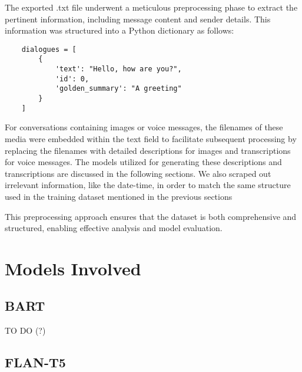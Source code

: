 \documentclass[10pt,twocolumn,letterpaper]{article}
\begin{document}
The exported .txt file underwent a meticulous preprocessing phase to extract the pertinent information, including message content and sender details. 
This information was structured into a Python dictionary as follows:

\begin{lstlisting}
    dialogues = [
        {
            'text': "Hello, how are you?",
            'id': 0,
            'golden_summary': "A greeting"
        }
    ]
\end{lstlisting}
For conversations containing images or voice messages, the filenames of these media were embedded within the text field to facilitate subsequent processing by replacing the filenames with detailed descriptions for images and transcriptions for voice messages. 
The models utilized for generating these descriptions and transcriptions are discussed in the following sections.
We also scraped out irrelevant information, like the date-time, in order to match the same structure used in the training dataset mentioned in the previous sections 

This preprocessing approach ensures that the dataset is both comprehensive and structured, enabling effective analysis and model evaluation.
\section{Models Involved}

\subsection{BART}

TO DO (?)

\subsection{FLAN-T5}
\end{document}
